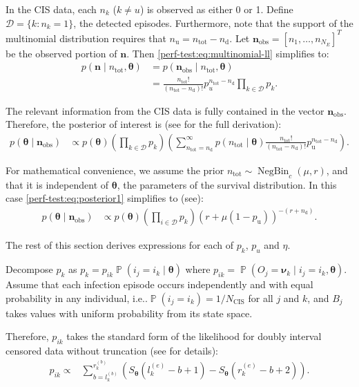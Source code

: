 \documentclass[12pt]{article}
\makeatletter
\def\dist{\sim}
\DeclareMathOperator{\prob}{\mathbb{P}}
\DeclareMathOperator{\NBr}{NegBin}
\newcommand{\NBc}{\NBr_{c}}
\newcommand\set{\mathcal}
\renewcommand{\vec}[1]{\bm{#1}}
\newcommand{\ssep}{:}
\newcommand{\ntot}{n_\text{tot}}
\newcommand{\ndet}{n_\text{d}}
\newcommand{\nnodet}{n_\text{u}}
\newcommand{\pnodet}{p_\text{u}}
\newcommand{\Ncis}{N_\text{CIS}}
\newcommand{\na}{\vec{n}_\text{obs}}
\DeclareRobustCommand\onedot{\futurelet\@let@token\@onedot}
\def\@onedot{\ifx\@let@token.\else.\null\fi\xspace}
\def\ie{i.e\onedot} \def\Ie{{I.e}\onedot}
\makeatother
\begin{document}
In the CIS data, each $n_k$ ($k \neq u$) is observed as either 0 or 1.
Define $\set{D} = \{ k \ssep n_k = 1 \}$, the detected episodes.
Furthermore, note that the support of the multinomial distribution requires that $\nnodet = \ntot - \ndet$.
Let $\na = [n_{1}, \dots, n_{N_E}]^T$ be the observed portion of $\vec{n}$.
Then \cref{perf-test:eq:multinomial-ll} simplifies to:
\begin{align}
  p(\vec{n} \mid \ntot, \vec{\theta})
  &= p(\na \mid \ntot, \vec{\theta}) \\
  &= \frac{\ntot!}{(\ntot - \ndet)!} p_u^{\ntot-\ndet} \prod_{k \in \set{D}} p_k.
  \label{perf-test:eq:multinomial}
\end{align}

The relevant information from the CIS data is fully contained in the vector $\na$.
Therefore, the posterior of interest is (see for the full derivation):
\begin{align}
p(\vec{\theta} \mid \na)
&\propto  p(\vec{\theta}) \left( \prod_{k \in \set{D}} p_k \right) \left( \sum_{\ntot=\ndet}^\infty p(\ntot \mid \vec{\theta}) \frac{\ntot!}{(\ntot - \ndet)!} \pnodet^{\ntot - \ndet} \right).
\label{perf-test:eq:posterior1}
\end{align}

For mathematical convenience, we assume the prior $\ntot \dist \NBc(\mu, r)$, and that it is independent of $\vec{\theta}$, the parameters of the survival distribution.
In this case \cref{perf-test:eq:posterior1} simplifies to (see):
\begin{align}
p(\vec{\theta} \mid \na)
&\propto p(\vec{\theta}) \left( \prod_{i \in \set{D}} p_k \right) (r + \mu (1- \pnodet))^{-(r+\ndet)} \label{perf-test:eq:full-posterior}.
\end{align}

The rest of this section derives expressions for each of $p_{k}$, $p_{u}$ and $\eta$.

Decompose $p_k$ as $p_k = p_{ik} \prob(i_j = i_k \mid \vec{\theta})$
where $p_{ik} = \prob(O_j = \vec{\nu}_k \mid i_j = i_k, \vec{\theta})$.
Assume that each infection episode occurs independently and with equal probability in any individual, \ie $\prob(i_j = i_k) = 1/\Ncis$ for all $j$ and $k$, and $B_j$ takes values with uniform probability from its state space.

Therefore, $p_{ik}$ takes the standard form of the likelihood for doubly interval censored data without truncation (see for details):
\begin{align}
p_{ik}
\propto& \sum_{b = l_k^{(b)}}^{r_k^{(b)}} \left( S_{\vec{\theta}}(l_k^{(e)} - b + 1) - S_{\vec{\theta}}(r_k^{(e)} - b + 2) \right).
\label{perf-test:eq:pia}
\end{align}
\end{document}
